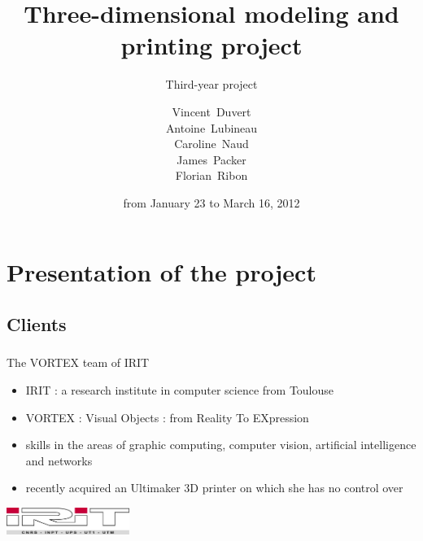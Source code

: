\documentclass{beamer}
\title{Three-dimensional modeling and printing project}
\subtitle{Third-year project}
\author[V. Duvert, A. Lubineau, C. Naud, J. Packer, F. Ribon]{\scriptsize
Vincent~Duvert \\ Antoine~Lubineau \\ Caroline~Naud \\ James~Packer \\ Florian~Ribon}
\date{from January 23 to March 16, 2012}
\begin{document}
\frame{\titlepage}

\section{Presentation of the project}

\subsection{Clients}
\begin{frame}
	\frametitle{}
	
	\begin{block}{The \textsc{VORTEX} team of IRIT}
		\begin{itemize}
		\item \textsc{IRIT} : a research institute in computer science from Toulouse
		\item \textsc{VORTEX} : Visual Objects : from Reality To EXpression
		\item skills in the areas of graphic computing,  computer vision, artificial intelligence and networks
		\item recently acquired an Ultimaker 3D printer on which she has no control over
		\end{itemize}
    \end{block}
    
    \begin{center}
		\includegraphics[width=4cm]{irit}
	\end{center}
    
\end{frame}
\end{document}
